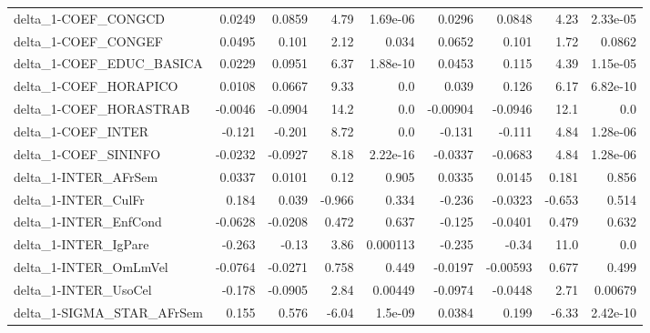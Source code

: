 \begin{tabular}{lrrrrrrrr}
delta\_1-COEF\_CONGCD                   &      0.0249 &       0.0859 &     4.79 & 1.69e-06 &     0.0296 &      0.0848 &         4.23 &      2.33e-05 \\
delta\_1-COEF\_CONGEF                   &      0.0495 &        0.101 &     2.12 &    0.034 &     0.0652 &       0.101 &         1.72 &        0.0862 \\
delta\_1-COEF\_EDUC\_BASICA              &      0.0229 &       0.0951 &     6.37 & 1.88e-10 &     0.0453 &       0.115 &         4.39 &      1.15e-05 \\
delta\_1-COEF\_HORAPICO                 &      0.0108 &       0.0667 &     9.33 &      0.0 &      0.039 &       0.126 &         6.17 &      6.82e-10 \\
delta\_1-COEF\_HORASTRAB                &     -0.0046 &      -0.0904 &     14.2 &      0.0 &   -0.00904 &     -0.0946 &         12.1 &           0.0 \\
delta\_1-COEF\_INTER                    &      -0.121 &       -0.201 &     8.72 &      0.0 &     -0.131 &      -0.111 &         4.84 &      1.28e-06 \\
delta\_1-COEF\_SININFO                  &     -0.0232 &      -0.0927 &     8.18 & 2.22e-16 &    -0.0337 &     -0.0683 &         4.84 &      1.28e-06 \\
delta\_1-INTER\_AFrSem                  &      0.0337 &       0.0101 &     0.12 &    0.905 &     0.0335 &      0.0145 &        0.181 &         0.856 \\
delta\_1-INTER\_CulFr                   &       0.184 &        0.039 &   -0.966 &    0.334 &     -0.236 &     -0.0323 &       -0.653 &         0.514 \\
delta\_1-INTER\_EnfCond                 &     -0.0628 &      -0.0208 &    0.472 &    0.637 &     -0.125 &     -0.0401 &        0.479 &         0.632 \\
delta\_1-INTER\_IgPare                  &      -0.263 &        -0.13 &     3.86 & 0.000113 &     -0.235 &       -0.34 &         11.0 &           0.0 \\
delta\_1-INTER\_OmLmVel                 &     -0.0764 &      -0.0271 &    0.758 &    0.449 &    -0.0197 &    -0.00593 &        0.677 &         0.499 \\
delta\_1-INTER\_UsoCel                  &      -0.178 &      -0.0905 &     2.84 &  0.00449 &    -0.0974 &     -0.0448 &         2.71 &       0.00679 \\
delta\_1-SIGMA\_STAR\_AFrSem             &       0.155 &        0.576 &    -6.04 &  1.5e-09 &     0.0384 &       0.199 &        -6.33 &      2.42e-10 \\

\end{tabular}
